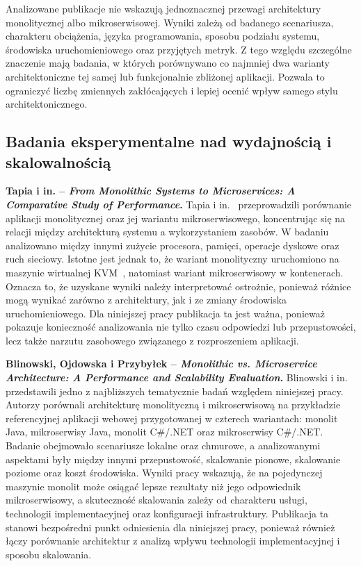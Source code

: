 Analizowane publikacje nie wskazują jednoznacznej przewagi architektury monolitycznej albo mikroserwisowej. Wyniki zależą od badanego scenariusza, charakteru obciążenia, języka programowania, sposobu podziału systemu, środowiska uruchomieniowego oraz przyjętych metryk. Z tego względu szczególne znaczenie mają badania, w których porównywano co najmniej dwa warianty architektoniczne tej samej lub funkcjonalnie zbliżonej aplikacji. Pozwala to ograniczyć liczbę zmiennych zakłócających i lepiej ocenić wpływ samego stylu architektonicznego.

\subsection*{Badania eksperymentalne nad wydajnością i skalowalnością}

\noindent\textbf{Tapia i in. -- \textit{From Monolithic Systems to Microservices: A Comparative Study of Performance}.}
Tapia i in.~\cite{tapia2020monolithic} przeprowadzili porównanie aplikacji monolitycznej oraz jej wariantu mikroserwisowego, koncentrując się na relacji między architekturą systemu a wykorzystaniem zasobów. W badaniu analizowano między innymi zużycie procesora, pamięci, operacje dyskowe oraz ruch sieciowy. Istotne jest jednak to, że wariant monolityczny uruchomiono na maszynie wirtualnej KVM~\cite{kvm}, natomiast wariant mikroserwisowy w kontenerach. Oznacza to, że uzyskane wyniki należy interpretować ostrożnie, ponieważ różnice mogą wynikać zarówno z architektury, jak i ze zmiany środowiska uruchomieniowego. Dla niniejszej pracy publikacja ta jest ważna, ponieważ pokazuje konieczność analizowania nie tylko czasu odpowiedzi lub przepustowości, lecz także narzutu zasobowego związanego z rozproszeniem aplikacji.

\medskip

\noindent\textbf{Blinowski, Ojdowska i Przybyłek -- \textit{Monolithic vs. Microservice Architecture: A Performance and Scalability Evaluation}.}
Blinowski i in.~\cite{blinowski2022monolithic} przedstawili jedno z najbliższych tematycznie badań względem niniejszej pracy. Autorzy porównali architekturę monolityczną i mikroserwisową na przykładzie referencyjnej aplikacji webowej przygotowanej w czterech wariantach: monolit Java, mikroserwisy Java, monolit C\#/.NET oraz mikroserwisy C\#/.NET. Badanie obejmowało scenariusze lokalne oraz chmurowe, a analizowanymi aspektami były między innymi przepustowość, skalowanie pionowe, skalowanie poziome oraz koszt środowiska. Wyniki pracy wskazują, że na pojedynczej maszynie monolit może osiągać lepsze rezultaty niż jego odpowiednik mikroserwisowy, a skuteczność skalowania zależy od charakteru usługi, technologii implementacyjnej oraz konfiguracji infrastruktury. Publikacja ta stanowi bezpośredni punkt odniesienia dla niniejszej pracy, ponieważ również łączy porównanie architektur z analizą wpływu technologii implementacyjnej i sposobu skalowania.

